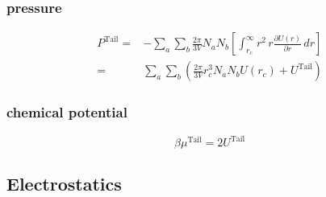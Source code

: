 \subsubsection*{pressure}
\begin{align}
 P^{\text{Tail}}=&-\sum_a \sum_b \frac{2\pi}{3V} N_a N_b \left[\int_{r_c}^\infty r^2\, r\frac{\partial U\left(r\right)}{\partial r}\, dr\right]\\
    =&\sum_a \sum_b\left(\frac{2\pi}{3V} r_c^3 N_a N_b U\left(r_c\right)+U^{\text{Tail}}\right)
\end{align}
\subsubsection*{chemical potential}
\begin{equation}
 \beta \mu^{\text{Tail}}=2 U^{\text{Tail}}
\end{equation}

\subsection{Electrostatics}

